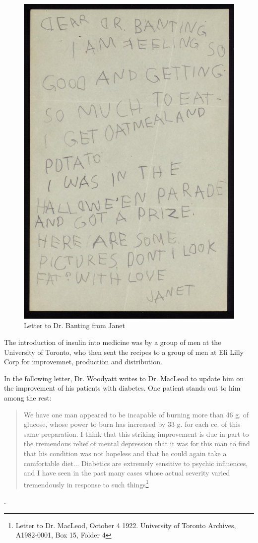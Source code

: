 \documentclass[12pt]{article}
\begin{document}
\begin{figure}[H]
\centering
  \includegraphics [width=5.5in]{banting_fat}
  \caption{Letter to Dr. Banting from Janet}
  \label{fig:Letter from Janet}
\end{figure}

The introduction of insulin into medicine was by a group of men at the University of Toronto, who then sent the recipes to a group of men at Eli Lilly Corp for improvemnet, production and distribution. 

In the following letter, Dr. Woodyatt writes to Dr. MacLeod to update him on the improvement of his patients with diabetes. One patient stands out to him among the rest:
\begin{quote} \singlespacing
We have one man appeared to be incapable of burning more than 46 g. of glucose, whose power to burn has increased by 33 g. for each cc. of this same preparation. I think that this striking improvement is due in part to the tremendous relief of mental depression that it was for this man to find that his condition was not hopeless and that he could again take a comfortable diet... Diabetics are extremely sensitive to psychic influences, and I have seen in the past many cases whose actual severity varied tremendously in response to such things\footnote{Letter to Dr. MacLeod, October 4 1922. University of Toronto Archives, A1982-0001, Box 15, Folder 4}\end{quote}. 
\end{document}
